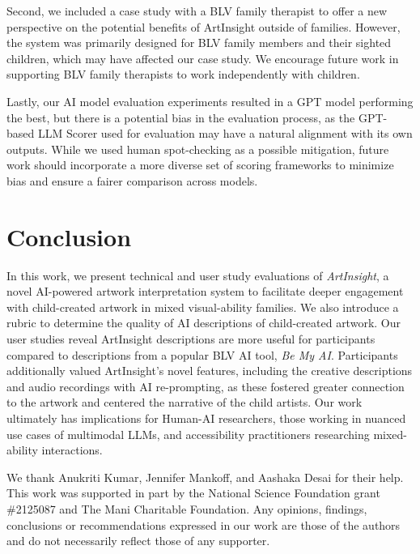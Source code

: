 \documentclass[sigconf]{acmart}
\begin{document}
Second, we included a case study with a BLV family therapist to offer a new perspective on the potential benefits of ArtInsight outside of families. However, the system was primarily designed for BLV family members and their sighted children, which may have affected our case study. We encourage future work in supporting BLV family therapists to work independently with children.

Lastly, our AI model evaluation experiments resulted in a GPT model performing the best, but there is a potential bias in the evaluation process, as the GPT-based LLM Scorer used for evaluation may have a natural alignment with its own outputs. While we used human spot-checking as a possible mitigation, future work should incorporate a more diverse set of scoring frameworks to minimize bias and ensure a fairer comparison across models.

\section{Conclusion}
In this work, we present technical and user study evaluations of \textit{ArtInsight}, a novel AI-powered artwork interpretation system to facilitate deeper engagement with child-created artwork in mixed visual-ability families. We also introduce a rubric to determine the quality of AI descriptions of child-created artwork. Our user studies reveal ArtInsight descriptions are more useful for participants compared to descriptions from a popular BLV AI tool, \textit{Be My AI}. Participants additionally valued ArtInsight's novel features, including the creative descriptions and audio recordings with AI re-prompting, as these fostered greater connection to the artwork and centered the narrative of the child artists. Our work ultimately has implications for Human-AI researchers, those working in nuanced use cases of multimodal LLMs, and accessibility practitioners researching mixed-ability interactions.

\begin{acks}
We thank Anukriti Kumar, Jennifer Mankoff, and Aashaka Desai for their help. This work was supported in part by the National Science Foundation grant \#2125087 and The Mani Charitable Foundation. Any opinions, findings, conclusions or recommendations expressed in our work are those of the authors and do not necessarily reflect those of any supporter.
\end{acks}



\end{document}
